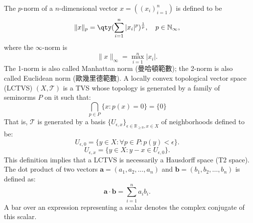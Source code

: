 \documentclass[a4paper,12pt]{report}
\begin{document}
The $p$-norm of a $n$-dimensional vector $x=((x_i)_{i=1}^n)$ is defined to be
\[\|x\|_p=\qty(\sum_{i=1}^n|x_i|^p)^{\frac{1}{p}},\quad p\in\mathbb{N}_{\infty},\]
where the $\infty$-norm is
\[\|x\|_{\infty}=\max_{i=1}^n|x_i|.\]
The 1-norm is also called Manhattan norm (曼哈頓範數); the 2-norm is also called Euclidean norm (歐幾里德範數).
A locally convex topological vector space (LCTVS) $(X,\mathcal{T})$ is a TVS whose topology is generated by a family of seminorms $P$ on it such that:
\[\bigcap_{p\in P}\{x\colon p(x)=0\}=\{0\}\]
That is, $\mathcal{T}$ is generated by a basis $\{U_{\epsilon,x}\}_{\epsilon\in\mathbb{R}_{\geq 0},x\in X}$ of neighborhoods defined to be:
\[U_{\epsilon,0}=\{y\in X\colon \forall p\in P\colon p(y)<\epsilon\}.\]
\[U_{\epsilon,x}=\{y\in X\colon y-x\in U_{\epsilon,0}\}.\]
This definition implies that a LCTVS is necessarily a Hausdorff space (T2 space).
The dot product of two vectors $\mathbf{a}=(a_1,a_2,\dots,a_n)$ and $\mathbf{b}=(b_1,b_2,\dots,b_n)$ is defined as:
\[\mathbf{a}\cdot\mathbf{b}=\sum_{i=1}^n a_ib_i.\]
A bar over an expression representing a scalar denotes the complex conjugate of this scalar.
\end{document}
